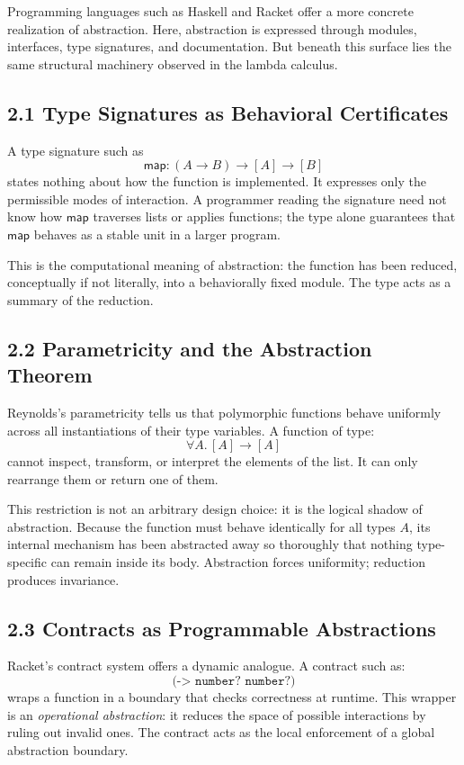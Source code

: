 \documentclass[11pt,letterpaper]{article}
\begin{document}
Programming languages such as Haskell and Racket offer a more concrete realization of abstraction. Here, abstraction is expressed through modules, interfaces, type signatures, and documentation. But beneath this surface lies the same structural machinery observed in the lambda calculus.

\subsection{2.1 Type Signatures as Behavioral Certificates}

A type signature such as
\[
\mathsf{map} : (A \to B) \to [A] \to [B]
\]
states nothing about how the function is implemented. It expresses only the permissible modes of interaction. A programmer reading the signature need not know how \(\mathsf{map}\) traverses lists or applies functions; the type alone guarantees that \(\mathsf{map}\) behaves as a stable unit in a larger program.

This is the computational meaning of abstraction: the function has been reduced, conceptually if not literally, into a behaviorally fixed module. The type acts as a summary of the reduction.

\subsection{2.2 Parametricity and the Abstraction Theorem}

Reynolds’s parametricity tells us that polymorphic functions behave uniformly across all instantiations of their type variables. A function of type:
\[
\forall A.\, [A] \to [A]
\]
cannot inspect, transform, or interpret the elements of the list. It can only rearrange them or return one of them.

This restriction is not an arbitrary design choice: it is the logical shadow of abstraction. Because the function must behave identically for all types \(A\), its internal mechanism has been abstracted away so thoroughly that nothing type-specific can remain inside its body. Abstraction forces uniformity; reduction produces invariance.

\subsection{2.3 Contracts as Programmable Abstractions}

Racket's contract system offers a dynamic analogue. A contract such as:
\[
\texttt{(-> number? number?)}
\]
wraps a function in a boundary that checks correctness at runtime. This wrapper is an \emph{operational abstraction}: it reduces the space of possible interactions by ruling out invalid ones. The contract acts as the local enforcement of a global abstraction boundary.
\end{document}
